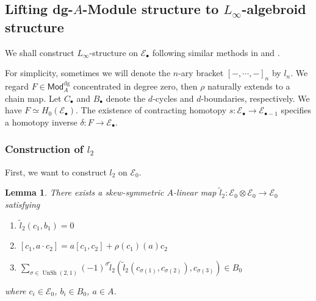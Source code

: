 \documentclass[12pt]{amsart}
\newtheorem{lem}[thm]{Lemma}
\theoremstyle{definition}
\theoremstyle{remark}
\numberwithin{equation}{section}
\newcommand{\1}{{\mathbb{1}}}
\newcommand{\E}{{\mathcal{E}}}
\newcommand{\dgmod}{\mathsf{Mod}^{\operatorname{dg}}}
\newcommand{\unsh}{\operatorname{UnSh}}
\begin{document}
\subsection{Lifting dg-$A$-Module structure to                                             $L_{\infty}$-algebroid structure}
We shall construct $L_{\infty}$-structure on $\E_{\bullet}$ following similar methods in \cite{BFLS97} and \cite{LLS20}.


For simplicity, sometimes we will denote the $n$-ary bracket $[-,\cdots,-]_n$ by $l_n$. We regard $F\in \dgmod_A$ concentrated in degree zero, then $\rho$ naturally extends to a chain map. Let $C_{\bullet}$ and $B_{\bullet}$ denote the $d$-cycles and $d$-boundaries, respectively. We have $F\simeq H_0(\E_{\bullet})$. The existence of contracting homotopy $s:\E_{\bullet}\to \E_{\bullet-1}$ specifies a homotopy inverse $\delta: F \to \E_{\bullet}$.

\subsubsection{Construction of $l_2$}
First, we want to construct $l_2$ on $\E_{0}$. 
\begin{lem}
	There exists a  skew-symmetric $A$-linear map $\tilde{l}_2: \E_{0} \otimes \E_{0} \to \E_{0}$ satisfying
	\begin{enumerate}
		\item $ \tilde{l}_2(c_1, b_1) = 0$
		\item $[c_1, a\cdot c_2]= a[c_1, c_2] + 
		\rho(c_1)(a) c_2$
		\item $\sum_{\sigma \in \unsh(2,1)} (-1)^{\sigma} \tilde{l}_2(\tilde{l}_2( c_{\sigma(1)},c_{\sigma(2)}), c_{\sigma(3)}) \in B_0$
	\end{enumerate}
where $c_i \in \E_0$, $b_i \in B_0$, $a\in A$.
\end{lem}
\end{document}

